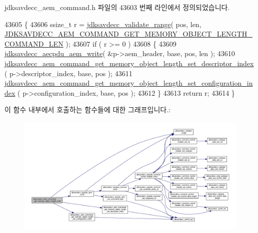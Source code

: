jdksavdecc\+\_\+aem\+\_\+command.\+h 파일의 43603 번째 라인에서 정의되었습니다.


\begin{DoxyCode}
43605 \{
43606     ssize\_t r = \hyperlink{group__util_ga9c02bdfe76c69163647c3196db7a73a1}{jdksavdecc\_validate\_range}( pos, len, 
      \hyperlink{group__command__get__memory__object__length_gadecd0d8e632fe8a8f6bb6f28b059b0dd}{JDKSAVDECC\_AEM\_COMMAND\_GET\_MEMORY\_OBJECT\_LENGTH\_COMMAND\_LEN}
       );
43607     \textcolor{keywordflow}{if} ( r >= 0 )
43608     \{
43609         \hyperlink{group__aecpdu__aem_gad658e55771cce77cecf7aae91e1dcbc5}{jdksavdecc\_aecpdu\_aem\_write}( &p->aem\_header, base, pos, len );
43610         \hyperlink{group__command__get__memory__object__length_ga856c1b899d53f8e117c1d25266e6c3ae}{jdksavdecc\_aem\_command\_get\_memory\_object\_length\_set\_descriptor\_index}
      ( p->descriptor\_index, base, pos );
43611         \hyperlink{group__command__get__memory__object__length_ga29c361b4027cc3e297ccd0410835e75b}{jdksavdecc\_aem\_command\_get\_memory\_object\_length\_set\_configuration\_index}
      ( p->configuration\_index, base, pos );
43612     \}
43613     \textcolor{keywordflow}{return} r;
43614 \}
\end{DoxyCode}


이 함수 내부에서 호출하는 함수들에 대한 그래프입니다.\+:
\nopagebreak
\begin{figure}[H]
\begin{center}
\leavevmode
\includegraphics[width=350pt]{group__command__get__memory__object__length_ga1118e1b9b0f1ad906e2d8621ace68778_cgraph}
\end{center}
\end{figure}


